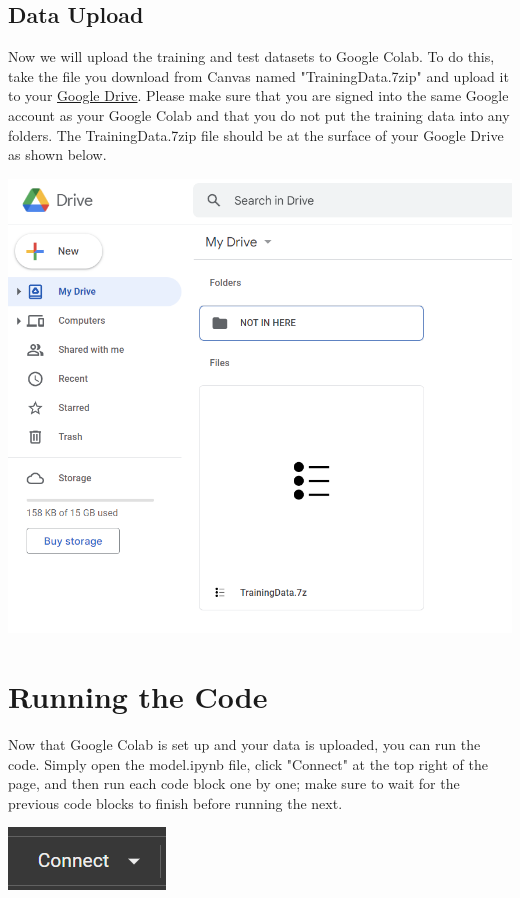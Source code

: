 \documentclass[11pt]{report}
\begin{document}
\section{Data Upload}
Now we will upload the training and test datasets to Google Colab. To do this, take the file you download from Canvas named "TrainingData.7zip" and upload it to your \href{https://drive.google.com/drive}{Google Drive}.
Please make sure that you are signed into the same Google account as your Google Colab and that you do not put the training data into any folders. The TrainingData.7zip file should be at the surface of your Google Drive as shown below.

\begin{center}
    \includegraphics[scale=0.5]{trainingdata.png}
\end{center}

\chapter{Running the Code}
Now that Google Colab is set up and your data is uploaded, you can run the code. Simply open the model.ipynb file, click "Connect" at the top right of the page, and then run each code block one by one; make sure to wait for the previous code blocks to finish before running the next.

\begin{center}
    \includegraphics[scale=0.4]{connect.png}
\end{center}
\end{document}
